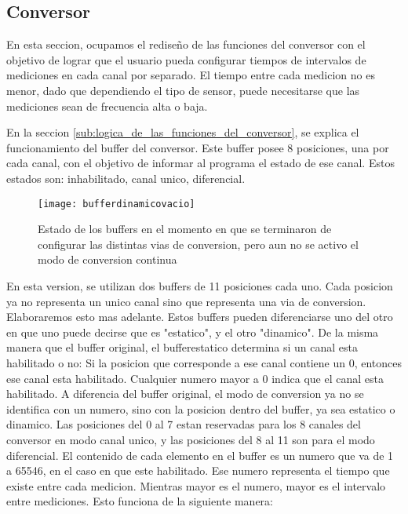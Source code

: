 \subsection{Conversor} %
\label{sub:conversor}


En esta seccion, ocupamos el rediseño de las funciones del conversor con el objetivo de lograr que el usuario pueda configurar tiempos de intervalos de mediciones en cada canal por separado. El tiempo entre cada medicion no es menor, dado que dependiendo el tipo de sensor, puede necesitarse que las mediciones sean de frecuencia alta o baja.

En la seccion \ref{sub:logica_de_las_funciones_del_conversor}, se explica el funcionamiento del buffer del conversor. Este buffer posee 8 posiciones, una por cada canal, con el objetivo de informar al programa el estado de ese canal. Estos estados son: inhabilitado, canal unico, diferencial.

\begin{figure}[h]
  \centering
  \texttt{[image: bufferdinamicovacio]}
  \caption{Estado de los buffers en el momento en que se terminaron de configurar las distintas vias de conversion, pero aun no se activo el modo de conversion continua}\label{fig:bufferdinamicovacio}
\end{figure}



En esta version, se utilizan dos buffers de 11 posiciones cada uno. Cada posicion ya no representa un unico canal sino que representa una via de conversion. Elaboraremos esto mas adelante. Estos buffers pueden diferenciarse uno del otro en que uno puede decirse que es "estatico", y el otro "dinamico". De la misma manera que el buffer original, el bufferestatico determina si un canal esta habilitado o no: Si la posicion que corresponde a ese canal contiene un 0, entonces ese canal esta habilitado. Cualquier numero mayor a  0 indica que el canal esta habilitado. A diferencia del buffer original, el modo de conversion ya no se identifica con un numero, sino con la posicion dentro del buffer, ya sea estatico o dinamico. Las posiciones del 0 al 7 estan reservadas para los 8 canales del conversor en modo canal unico, y las posiciones del 8 al 11 son para el modo diferencial. 
El contenido de cada elemento en el buffer es un numero que va de 1 a 65546, en el caso en que este habilitado. Ese numero representa el tiempo que existe entre cada medicion. Mientras mayor es el numero, mayor es el intervalo entre mediciones. Esto funciona de la siguiente manera:

